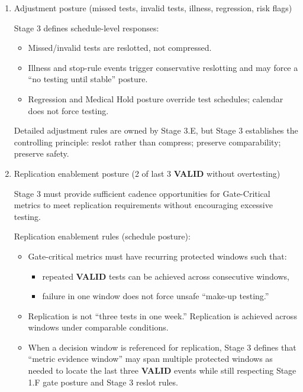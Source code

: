 \documentclass[10pt]{article}
\begin{document}
\begin{enumerate}
\item Adjustment posture (missed tests, invalid tests, illness, regression, risk flags)

Stage 3 defines schedule-level responses:

\begin{itemize}
\item Missed/invalid tests are reslotted, not compressed.
\item Illness and stop-rule events trigger conservative reslotting and may force a “no testing until stable” posture.
\item Regression and Medical Hold posture override test schedules; calendar does not force testing.
\end{itemize}

Detailed adjustment rules are owned by Stage 3.E, but Stage 3 establishes the controlling principle: reslot rather than compress; preserve comparability; preserve safety.

\item Replication enablement posture (2 of last 3 \textbf{VALID} without overtesting)

Stage 3 must provide sufficient cadence opportunities for Gate-Critical metrics to meet replication requirements without encouraging excessive testing.

Replication enablement rules (schedule posture):

\begin{itemize}
\item Gate-critical metrics must have recurring protected windows such that:
  \begin{itemize}
  \item repeated \textbf{VALID} tests can be achieved across consecutive windows,
  \item failure in one window does not force unsafe “make-up testing.”
  \end{itemize}
\item Replication is not “three tests in one week.” Replication is achieved across windows under comparable conditions.
\item When a decision window is referenced for replication, Stage 3 defines that “metric evidence window” may span multiple protected windows as needed to locate the last three \textbf{VALID} events while still respecting Stage 1.F gate posture and Stage 3 reslot rules.
\end{itemize}
\end{enumerate}
\end{document}

